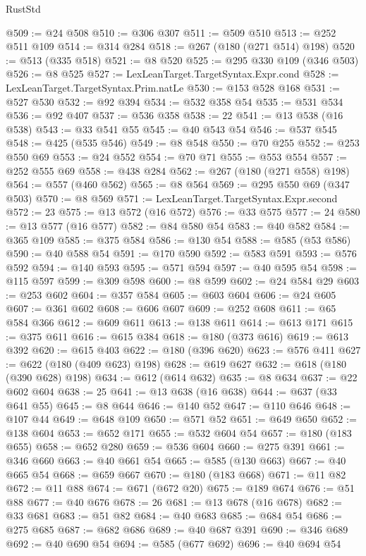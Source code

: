 \begin{lexlean}{RustStd}
\begin{coremodule}
{\begin{coremodule}
{{{{{{{{{{{{{{{{{{{{{{{{{{{{{{{{{{{@509 := @24 @508
@510 := @306 @307
@511 := @509 @510
@513 := @252 @511 @109
@514 := @314 @284
@518 := @267 (@180 (@271 @514) @198)
@520 := @513 (@335 @518)
@521 := @8 @520
@525 := @295 @330 @109 (@346 @503)
@526 := @8 @525
@527 := LexLeanTarget.TargetSyntax.Expr.cond
@528 := LexLeanTarget.TargetSyntax.Prim.natLe
@530 := @153 @528 @168
@531 := @527 @530
@532 := @92 @394
@534 := @532 @358 @54
@535 := @531 @534
@536 := @92 @407
@537 := @536 @358
@538 := 22
@541 := @13 @538 (@16 @538)
@543 := @33 @541 @55
@545 := @40 @543 @54
@546 := @537 @545
@548 := @425 (@535 @546)
@549 := @8 @548
@550 := @70 @255
@552 := @253 @550 @69
@553 := @24 @552
@554 := @70 @71
@555 := @553 @554
@557 := @252 @555 @69
@558 := @438 @284
@562 := @267 (@180 (@271 @558) @198)
@564 := @557 (@460 @562)
@565 := @8 @564
@569 := @295 @550 @69 (@347 @503)
@570 := @8 @569
@571 := LexLeanTarget.TargetSyntax.Expr.second
@572 := 23
@575 := @13 @572 (@16 @572)
@576 := @33 @575
@577 := 24
@580 := @13 @577 (@16 @577)
@582 := @84 @580 @54
@583 := @40 @582
@584 := @365 @109
@585 := @375 @584
@586 := @130 @54
@588 := @585 (@53 @586)
@590 := @40 @588 @54
@591 := @170 @590
@592 := @583 @591
@593 := @576 @592
@594 := @140 @593
@595 := @571 @594
@597 := @40 @595 @54
@598 := @115 @597
@599 := @309 @598
@600 := @8 @599
@602 := @24 @584 @29
@603 := @253 @602
@604 := @357 @584
@605 := @603 @604
@606 := @24 @605
@607 := @361 @602
@608 := @606 @607
@609 := @252 @608
@611 := @65 @584 @366
@612 := @609 @611
@613 := @138 @611
@614 := @613 @171
@615 := @375 @611
@616 := @615 @384
@618 := @180 (@373 @616)
@619 := @613 @392
@620 := @615 @403
@622 := @180 (@396 @620)
@623 := @576 @411
@627 := @622 (@180 (@409 @623) @198)
@628 := @619 @627
@632 := @618 (@180 (@390 @628) @198)
@634 := @612 (@614 @632)
@635 := @8 @634
@637 := @22 @602 @604
@638 := 25
@641 := @13 @638 (@16 @638)
@644 := @637 (@33 @641 @55)
@645 := @8 @644
@646 := @140 @52
@647 := @110 @646
@648 := @107 @44
@649 := @648 @109
@650 := @571 @52
@651 := @649 @650
@652 := @138 @604
@653 := @652 @171
@655 := @532 @604 @54
@657 := @180 (@183 @655)
@658 := @652 @280
@659 := @536 @604
@660 := @275 @391
@661 := @346 @660
@663 := @40 @661 @54
@665 := @585 (@130 @663)
@667 := @40 @665 @54
@668 := @659 @667
@670 := @180 (@183 @668)
@671 := @11 @82
@672 := @11 @88
@674 := @671 (@672 @20)
@675 := @189 @674
@676 := @51 @88
@677 := @40 @676
@678 := 26
@681 := @13 @678 (@16 @678)
@682 := @33 @681
@683 := @51 @82
@684 := @40 @683
@685 := @684 @54
@686 := @275 @685
@687 := @682 @686
@689 := @40 @687 @391
@690 := @346 @689
@692 := @40 @690 @54
@694 := @585 (@677 @692)
@696 := @40 @694 @54
}}}}}}}}}}}}}}}}}}}}}}}}}}}}}}}}}}}
\end{coremodule}}
\end{coremodule}
\end{lexlean}
